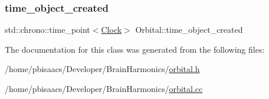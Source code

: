 \mbox{\label{classOrbital_a0c5c5ea93a03de69e7aa0267d74d8740}} 
\subsubsection{\texorpdfstring{time\+\_\+object\+\_\+created}{time\_object\_created}}
{\footnotesize\ttfamily std\+::chrono\+::time\+\_\+point$<$\mbox{\hyperlink{universe_8h_a0ef8d951d1ca5ab3cfaf7ab4c7a6fd80}{Clock}}$>$ Orbital\+::time\+\_\+object\+\_\+created\hspace{0.3cm}{\ttfamily [private]}}



The documentation for this class was generated from the following files\+:\begin{DoxyCompactItemize}
\item 
/home/pbisaacs/\+Developer/\+Brain\+Harmonics/\mbox{\hyperlink{orbital_8h}{orbital.\+h}}\item 
/home/pbisaacs/\+Developer/\+Brain\+Harmonics/\mbox{\hyperlink{orbital_8cc}{orbital.\+cc}}\end{DoxyCompactItemize}
